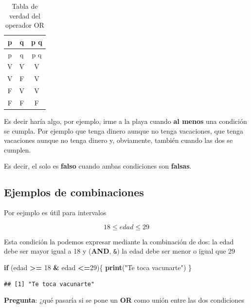 \documentclass[
]{book}
\newenvironment{Shaded}{\begin{snugshade}}{\end{snugshade}}
\newcommand{\ControlFlowTok}[1]{\textcolor[rgb]{0.13,0.29,0.53}{\textbf{#1}}}
\newcommand{\DecValTok}[1]{\textcolor[rgb]{0.00,0.00,0.81}{#1}}
\newcommand{\FunctionTok}[1]{\textcolor[rgb]{0.13,0.29,0.53}{\textbf{#1}}}
\newcommand{\NormalTok}[1]{#1}
\newcommand{\SpecialCharTok}[1]{\textcolor[rgb]{0.81,0.36,0.00}{\textbf{#1}}}
\newcommand{\StringTok}[1]{\textcolor[rgb]{0.31,0.60,0.02}{#1}}
\begin{document}
\begin{longtable}[]{@{}ccc@{}}
\caption{Tabla de verdad del operador OR}\tabularnewline
\toprule\noalign{}
p & q & p \textbar{} q \\
\midrule\noalign{}
\endfirsthead
\toprule\noalign{}
p & q & p \textbar{} q \\
\midrule\noalign{}
\endhead
\bottomrule\noalign{}
\endlastfoot
V & V & V \\
V & F & V \\
F & V & V \\
F & F & F \\
\end{longtable}

Es decir haría algo, por ejemplo, irme a la playa cuando \textbf{al menos} una condición se cumpla. Por ejemplo que tenga dinero aunque no tenga vacaciones, que tenga vacaciones aunque no tenga dinero y, obviamente, también cuando las dos se cumplen.

Es decir, el \texttt{\textbar{}} solo es \textbf{falso} cuando ambas condiciones son \textbf{falsas}.

\hypertarget{ejemplos-de-combinaciones}{%
\subsection{Ejemplos de combinaciones}\label{ejemplos-de-combinaciones}}

Por eejmplo es útil para intervalos

\[
18 \leq edad \leq 29 
\]

Esta condición la podemos expresar mediante la combinación de dos: la edad debe ser mayor igual a 18 y (\textbf{AND}, \texttt{\&}) la edad debe ser menor o igual que 29

\begin{Shaded}
\begin{Highlighting}[]
\ControlFlowTok{if}\NormalTok{ (edad }\SpecialCharTok{\textgreater{}=} \DecValTok{18} \SpecialCharTok{\&}\NormalTok{ edad }\SpecialCharTok{\textless{}=}\DecValTok{29}\NormalTok{)\{}
  \FunctionTok{print}\NormalTok{(}\StringTok{"Te toca vacunarte"}\NormalTok{)}
\NormalTok{\}}
\end{Highlighting}
\end{Shaded}

\begin{verbatim}
## [1] "Te toca vacunarte"
\end{verbatim}

\textbf{Pregunta}: ¿qué pasaría si se pone un \textbf{OR} como unión entre las dos condiciones
\end{document}
